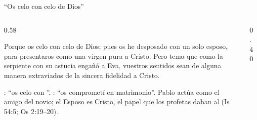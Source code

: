 \begin{frame}{``Os celo con celo de Dios''}
\begin{columns}[c,onlytextwidth]
\begin{column}{0.58\textwidth}
\begin{cita}Porque os celo con celo de Dios; pues os he desposado con un solo esposo, para presentaros como una virgen pura a Cristo. Pero temo que como la serpiente con su astucia engañó a Eva, vuestros sentidos sean de alguna manera extraviados de la sincera fidelidad a Cristo.\end{cita}
\scriptsize{}: ``os celo con ''. : ``os comprometí en matrimonio''. Pablo actúa como el amigo del novio; el Esposo es Cristo, el papel que los profetas daban al \SENOR{} (Is 54:5; Os 2:19--20).
\end{column}
\begin{column}{0.40\textwidth}\end{column}
\end{columns}
\end{frame}

